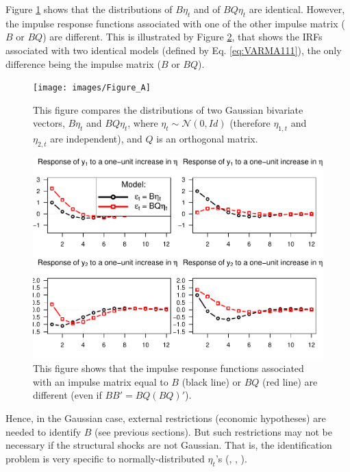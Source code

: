 \documentclass[
  12pt,
]{book}
\theoremstyle{definition}
\theoremstyle{definition}
\theoremstyle{definition}
\theoremstyle{definition}
\theoremstyle{remark}
\begin{document}
Figure \ref{fig:preMadeFigureICA} shows that the distributions of \(B \eta_t\) and of \(BQ\eta_t\) are identical. However, the impulse response functions associated with one of the other impulse matrix (\(B\) or \(BQ\)) are different. This is illustrated by Figure \ref{fig:preMadeFigureICA2}, that shows the IRFs associated with two identical models (defined by Eq. \eqref{eq:VARMA111}), the only difference being the impulse matrix (\(B\) or \(BQ\)).

\begin{figure}
\texttt{[image: images/Figure\_A]} \caption{This figure compares the distributions of two Gaussian bivariate vectors, $B \eta_t$ and $BQ\eta_t$, where $\eta_{t} \sim \mathcal{N}(0,Id)$ (therefore $\eta_{1,t}$ and $\eta_{2,t}$ are independent), and $Q$  is an orthogonal matrix.}\label{fig:preMadeFigureICA}
\end{figure}

\begin{figure}
\includegraphics[width=0.95\linewidth]{IdentifStructShocks_files/figure-latex/preMadeFigureICA2-1} \caption{This figure shows that the impulse response functions associated with an impulse matrix equal to $B$ (black line) or $BQ$ (red line) are different (even if $BB'=BQ(BQ)'$).}\label{fig:preMadeFigureICA2}
\end{figure}

Hence, in the Gaussian case, external restrictions (economic hypotheses) are needed to identify \(B\) (see previous sections). But such restrictions may not be necessary if the structural shocks are not Gaussian. That is, the identification problem is very specific to normally-distributed \(\eta_t\)'s (\citet{Rigobon_2003}, \citet{NORMANDIN20041217}, \citet{Lanne_Lutkepohl_2008}).
\end{document}
